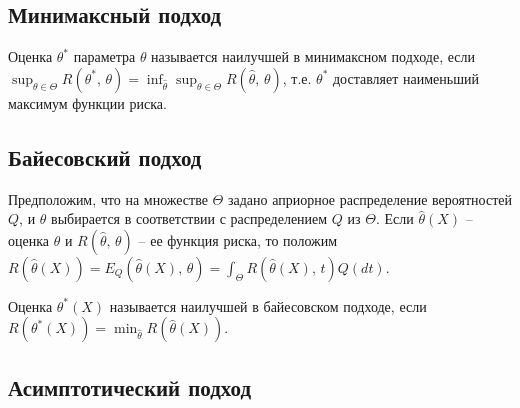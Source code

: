     \subsection{Минимаксный подход}
    \begin{definition}
    Оценка $\displaystyle \theta ^{*}$ параметра $\displaystyle \theta $ называется наилучшей в минимаксном подходе, если $\displaystyle \sup _{\theta \in \Theta } R\left( \theta ^{*} ,\, \theta \right) =\inf_{\hat{\theta }}\sup _{\theta \in \Theta } R(\hat{\theta } ,\, \theta )$, т.е. $\displaystyle \theta ^{*}$ доставляет наименьший максимум функции риска.
    \end{definition}
    \subsection{Байесовский подход}
    
    Предположим, что на множестве $\displaystyle \Theta $ задано априорное распределение вероятностей $\displaystyle Q$, и $\displaystyle \theta $ выбирается в соответствии с распределением $\displaystyle Q$ из $\displaystyle \Theta $. Если $\displaystyle \hat{\theta }( X)$ -- оценка $\displaystyle \theta $ и $\displaystyle R(\hat{\theta },\, \theta )$ -- ее функция риска, то положим $\displaystyle R(\hat{\theta }( X)) =E_{Q}(\hat{\theta }( X),\, \theta ) =\int _{\Theta } R(\hat{\theta }( X),\, t) Q( dt)$.
    \begin{definition}
    Оценка $\displaystyle \theta ^{*}( X)$ называется наилучшей в байесовском подходе, если $\displaystyle R\left( \theta ^{*}( X)\right) =\min_{\hat{\theta }} R(\hat{\theta }( X))$.
    \end{definition}
    \subsection{Асимптотический подход}
    
